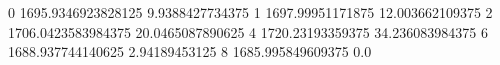 0 1695.9346923828125 9.9388427734375
1 1697.99951171875 12.003662109375
2 1706.0423583984375 20.0465087890625
4 1720.23193359375 34.236083984375
6 1688.937744140625 2.94189453125
8 1685.995849609375 0.0
